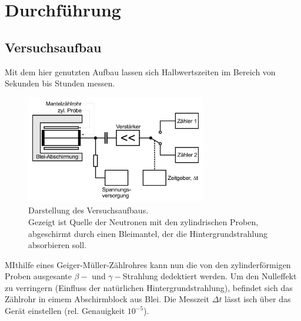 \newpage
\section{Durchführung}
\label{sec:Durchfuehrung}
\subsection{Versuchsaufbau}
Mit dem hier genutzten Aufbau lassen sich Halbwertszeiten im Bereich von Sekunden bis Stunden messen.
\begin{figure}
    \centering
    \includegraphics[width=0.7\textwidth]{bilder/Versuchsaufbau.jpg}
    \caption{Darstellung des Versuchsaufbaus.\\
    Gezeigt ist Quelle der Neutronen mit den zylindrischen Proben, abgeschirmt durch einen Bleimantel,
    der die Hintergrundstrahlung absorbieren soll.\cite[217]{anleitung}}
\end{figure}

MIthilfe eines Geiger-Müller-Zählrohres kann nun die von den zylinderförmigen Proben ausgesante $\beta-$ und 
$\gamma-$Strahlung dedektiert werden. Um den Nulleffekt zu verringern (Einfluss der natürlichen Hintergrundstrahlung),
befindet sich das Zählrohr in eimem Abschirmblock aus Blei.
Die Messzeit $\Delta t$ lässt isch über das Gerät einstellen (rel. Genauigkeit $10^{-5}$).
